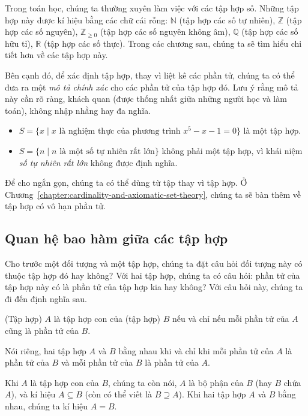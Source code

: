 Trong toán học, chúng ta thường xuyên làm việc với các tập hợp số. Những tập hợp này được kí hiệu bằng các chữ cái rỗng: $\mathbb{N}$ (tập hợp các số tự nhiên), $\mathbb{Z}$ (tập hợp các số nguyên), $\mathbb{Z}_{\geq 0}$ (tập hợp các số nguyên không âm), $\mathbb{Q}$ (tập hợp các số hữu tỉ), $\mathbb{R}$ (tập hợp các số thực). Trong các chương sau, chúng ta sẽ tìm hiểu chi tiết hơn về các tập hợp này.

Bên cạnh đó, để xác định tập hợp, thay vì liệt kê các phần tử, chúng ta có thể đưa ra một \textit{mô tả chính xác} cho các phần tử của tập hợp đó. Lưu ý rằng mô tả này cần rõ ràng, khách quan (được thống nhất giữa những người học và làm toán), không nhập nhằng hay đa nghĩa.
\begin{itemize}
    \item $S = \{ x \mid \text{$x$ là nghiệm thực của phương trình $x^{5} - x - 1 = 0$} \}$ là một tập hợp.
    \item $S = \{ n \mid \text{$n$ là một số tự nhiên rất lớn} \}$ không phải một tập hợp, vì khái niệm \textit{số tự nhiên rất lớn} không được định nghĩa.
\end{itemize}

Để cho ngắn gọn, chúng ta có thể dùng từ tập thay vì tập hợp. Ở Chương~\ref{chapter:cardinality-and-axiomatic-set-theory}, chúng ta sẽ bàn thêm về tập hợp có vô hạn phần tử.

\subsection{Quan hệ bao hàm giữa các tập hợp}

Cho trước một đối tượng và một tập hợp, chúng ta đặt câu hỏi đối tượng này có thuộc tập hợp đó hay không? Với hai tập hợp, chúng ta có câu hỏi: phần tử của tập hợp này có là phần tử của tập hợp kia hay không? Với câu hỏi này, chúng ta đi đến định nghĩa sau.

\begin{definition}
    (Tập hợp) $A$ là tập hợp con của (tập hợp) $B$ nếu và chỉ nếu mỗi phần tử của $A$ cũng là phần tử của $B$.

    Nói riêng, hai tập hợp $A$ và $B$ bằng nhau khi và chỉ khi mỗi phần tử của $A$ là phần tử của $B$ và mỗi phần tử của $B$ là phần tử của $A$.
\end{definition}

Khi $A$ là tập hợp con của $B$, chúng ta còn nói, $A$ là bộ phận của $B$ (hay $B$ chứa $A$), và kí hiệu $A\subseteq B$ (còn có thể viết là $B\supseteq A$). Khi hai tập hợp $A$ và $B$ bằng nhau, chúng ta kí hiệu $A = B$.

